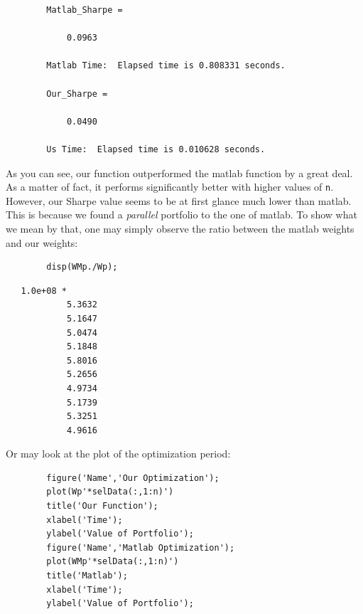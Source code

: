 \documentclass[12pt,titlepage,letter]{article}
\begin{document}
    \color{lightgray} \begin{verbatim}
		Matlab_Sharpe =

    		0.0963

		Matlab Time:  Elapsed time is 0.808331 seconds.

		Our_Sharpe =

		    0.0490

		Us Time:  Elapsed time is 0.010628 seconds.
	\end{verbatim} \color{black}
    \begin{par}
		As you can see, our function outperformed the matlab function by a great deal. As a matter of fact, it performs significantly better with higher values of \texttt{n}. However, our Sharpe value seems to be at first glance much lower than matlab. This is because we found a \textit{parallel} portfolio to the one of matlab. To show what we mean by that, one may simply observe the ratio between the matlab weights and our weights:
	\end{par} \vspace{1em}
	\begin{verbatim}
		disp(WMp./Wp);
	\end{verbatim}
        \color{lightgray} \begin{verbatim}   1.0e+08 *
		    5.3632
		    5.1647
		    5.0474
		    5.1848
		    5.8016
		    5.2656
		    4.9734
		    5.1739
		    5.3251
		    4.9616

	\end{verbatim} \color{black}
    \begin{par}
		Or may look at the plot of the optimization period:
	\end{par} \vspace{1em}
	\begin{verbatim}
		figure('Name','Our Optimization');
		plot(Wp'*selData(:,1:n)')
		title('Our Function');
		xlabel('Time');
		ylabel('Value of Portfolio');
		figure('Name','Matlab Optimization');
		plot(WMp'*selData(:,1:n)')
		title('Matlab');
		xlabel('Time');
		ylabel('Value of Portfolio');
	\end{verbatim}
\end{document}
